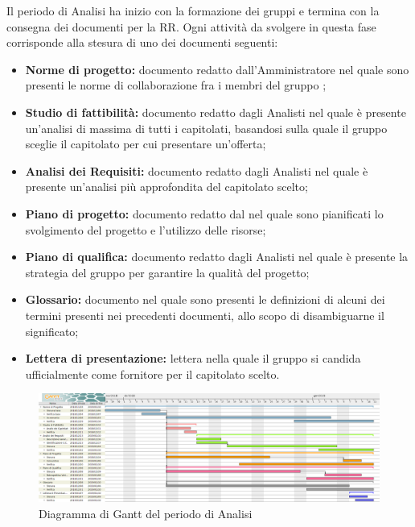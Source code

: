 Il periodo di Analisi ha inizio con la formazione dei gruppi e termina con la consegna dei documenti per la RR. \newline
Ogni attività da svolgere in questa fase corrisponde alla stesura di uno dei documenti seguenti: 
\begin{itemize}
	\item \textbf{Norme di progetto:}
	documento redatto dall'Amministratore nel quale sono presenti le norme di collaborazione fra i membri del gruppo \gruppo ;
	\item \textbf{Studio di fattibilità:}
	documento redatto dagli Analisti nel quale è presente un'analisi di massima di tutti 	i capitolati, basandosi sulla quale il gruppo sceglie il capitolato per cui presentare un'offerta;
	\item \textbf{Analisi dei Requisiti:}
	documento redatto dagli Analisti nel quale è presente un'analisi più approfondita del capitolato scelto;
	\item \textbf{Piano di progetto:}
	documento redatto dal \Res \space nel quale sono pianificati lo svolgimento del progetto e l'utilizzo delle risorse;
	\item \textbf{Piano di qualifica:}
	documento redatto dagli Analisti nel quale è presente la strategia del gruppo \gruppo \space per garantire la qualità del progetto;
	\item \textbf{Glossario:}
	documento nel quale sono presenti le definizioni di alcuni dei termini presenti nei precedenti documenti, allo scopo di disambiguarne il significato;
	\item \textbf{Lettera di presentazione:}
	lettera nella quale il gruppo \gruppo \space si candida ufficialmente come fornitore per il capitolato scelto.
\end{itemize}

\begin{figure}[H]
	\includegraphics[width=1\linewidth]{Pianificazione/Analisi_Gantt.png}
	\caption{Diagramma di Gantt del periodo di Analisi}
\end{figure}
